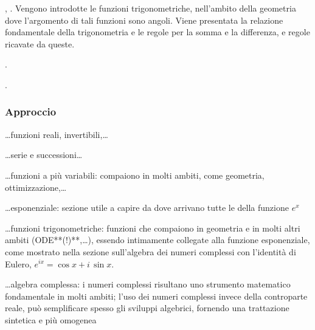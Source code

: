 \documentclass[letterpaper,10pt,italian]{jupyterBook}
\begin{document}
\sphinxAtStartPar
{\hyperref[\detokenize{ch/trigonometry:math-hs-trigonometry}]{}}, . Vengono introdotte le funzioni trigonometriche, nell’ambito della geometria dove l’argomento di tali funzioni sono angoli. Viene presentata la relazione fondamentale della trigonometria e le regole per la somma e la differenza, e regole ricavate da queste.

\sphinxAtStartPar
{\hyperref[\detokenize{ch/precalculus/polynomials:math-hs-precalculus-polynomials}]{}}. 

\sphinxAtStartPar
{\hyperref[\detokenize{ch/algebra/complex-algebra:math-hs-algebra-complex}]{}}. 
\subsubsection*{Approccio}

\sphinxAtStartPar
…funzioni reali, invertibili,…

\sphinxAtStartPar
…serie e successioni…

\sphinxAtStartPar
…funzioni a più variabili: compaiono in molti ambiti, come geometria, ottimizzazione,…

\sphinxAtStartPar
…esponenziale: sezione utile a capire da dove arrivano tutte le  della funzione \(e^x\)

\sphinxAtStartPar
…funzioni trigonometriche: funzioni che compaiono in geometria e in molti altri ambiti (ODE**(!)**,…), essendo intimamente collegate alla funzione esponenziale, come mostrato nella sezione sull’algebra dei numeri complessi con l’identità di Eulero, \(e^{i x} = \cos x + i \, \sin x\).

\sphinxAtStartPar
…algebra complessa: i numeri complessi risultano uno strumento matematico fondamentale in molti ambiti; l’uso dei numeri complessi invece della controparte reale, può semplificare spesso gli sviluppi algebrici, fornendo una trattazione sintetica e più omogenea

\sphinxAtStartPar
{}

\sphinxstepscope
\end{document}
